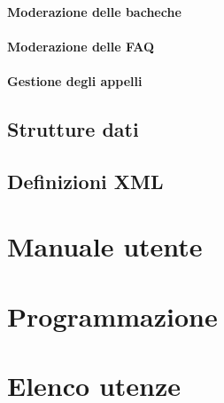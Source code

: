 \documentclass [a4paper,11pt]{book}
\begin{document}
\medskip

\subsubsection{Moderazione delle bacheche}

\medskip

\subsubsection{Moderazione delle FAQ}

\medskip

\subsubsection{Gestione degli appelli}

\medskip

\section{Strutture dati}

\section{Definizioni XML}

\chapter{Manuale utente}

\chapter{Programmazione}

\chapter{Elenco utenze}
\end{document}
